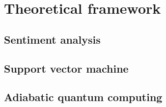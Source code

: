 \section[Theoretical framework]{Theoretical framework}
\label{sec:starting_theory}

\subsection{Sentiment analysis}

\subsection{Support vector machine}

\subsection{Adiabatic quantum computing}